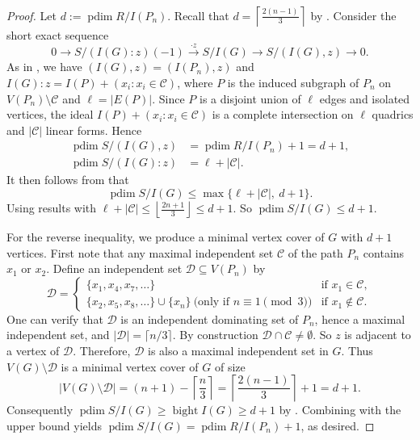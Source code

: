 \documentclass[12pt]{amsart}
\theoremstyle{plain}
\theoremstyle{definition}
\DeclareMathOperator{\pdim}{pdim}
\DeclareMathOperator{\bight}{bight}
\begin{document}
\begin{proof}
Let $d:=\pdim R/I(P_n)$. Recall that $d=\left\lceil\frac{2(n-1)}{3}\right\rceil$ by \cite[4.1.2 Proposition]{Bouchat}.
Consider the short exact sequence
\[
0 \longrightarrow S/(I(G):z)(-1)\xrightarrow{\cdot z} S/I(G)\longrightarrow S/(I(G),z)\longrightarrow 0.
\]
As in , we have $(I(G),z)=(I(P_n),z)$ and $I(G):z=I(P)+(x_i:x_i\in \mathcal{C})$, where
$P$ is the induced subgraph of $P_n$ on $V(P_n)\setminus \mathcal{C}$ and $\ell=|E(P)|$. Since $P$ is a disjoint union
of $\ell$ edges and isolated vertices, the ideal $I(P)+(x_i:x_i\in \mathcal{C})$ is a complete intersection on
$\ell$ quadrics and $|\mathcal{C}|$ linear forms. Hence
\begin{align*}
   \pdim S/(I(G),z)&=\pdim R/I(P_n)+1=d+1,\\
\pdim S/(I(G):z)&=\ell+|\mathcal{C}|. 
\end{align*}
It then follows from  that
\[
\pdim S/I(G)\le \max\{\ell+|\mathcal{C}|,\ d+1\}.
\]
Using  results with $\ell+|\mathcal{C}|\le \left\lfloor\frac{2n+1}{3}\right\rfloor\le d+1$. So $\pdim S/I(G)\le d+1$.

For the reverse inequality, we produce a minimal vertex cover of $G$ with $d+1$ vertices.
First note that any maximal independent set $\mathcal{C}$ of the path $P_n$ contains $x_1$ or $x_2$.
Define an independent set $\mathcal{D}\subseteq V(P_n)$ by
\[
\mathcal{D}=
\begin{cases}
\{x_1,x_4,x_7,\dots\} & \text{if } x_1\in \mathcal{C},\\
\{x_2,x_5,x_8,\dots\}\cup\{x_n\}\ \text{(only if }n\equiv 1\!\!\pmod 3) & \text{if } x_1\notin \mathcal{C}.
\end{cases}
\]
One can verify that $\mathcal{D}$ is an independent dominating set of $P_n$, hence a maximal independent set,
and $|\mathcal{D}|=\lceil n/3\rceil$. By construction $\mathcal{D}\cap \mathcal{C}\neq\emptyset$. So $z$ is adjacent to a vertex of $\mathcal{D}$. Therefore, $\mathcal{D}$ is also a maximal independent set in $G$. Thus $V(G)\setminus \mathcal{D}$ is a minimal vertex cover of $G$ of size
\[
|V(G)\setminus \mathcal{D}|=(n+1)-\left\lceil\frac{n}{3}\right\rceil
=
\left\lceil\frac{2(n-1)}{3}\right\rceil+1
=d+1.
\]
Consequently $\pdim S/I(G) \ge \bight I(G)\ge d+1$  by .
Combining with the upper bound yields $\pdim S/I(G)=\pdim R/I(P_n)+1$, as desired.
\end{proof}
\end{document}
